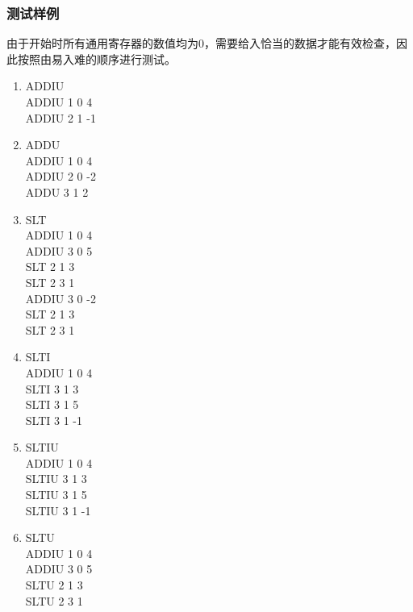         \subsubsection{测试样例}
            由于开始时所有通用寄存器的数值均为0，需要给入恰当的数据才能有效检查，因此按照由易入难的顺序进行测试。
            \begin{enumerate}
            \item
                ADDIU \\
                ADDIU 1 0 4 \\
                ADDIU 2 1 -1
            \item
                ADDU \\
                ADDIU 1 0 4 \\
                ADDIU 2 0 -2 \\
                ADDU 3 1 2
            \item
                SLT \\
                ADDIU 1 0 4 \\
                ADDIU 3 0 5 \\
                SLT 2 1 3 \\
                SLT 2 3 1 \\
                ADDIU 3 0 -2 \\
                SLT 2 1 3 \\
                SLT 2 3 1 \\
            \item
                SLTI \\
                ADDIU 1 0 4 \\
                SLTI 3 1 3 \\
                SLTI 3 1 5 \\
                SLTI 3 1 -1
            \item
                SLTIU \\
                ADDIU 1 0 4 \\
                SLTIU 3 1 3 \\
                SLTIU 3 1 5 \\
                SLTIU 3 1 -1
            \item
                SLTU \\
                ADDIU 1 0 4 \\
                ADDIU 3 0 5 \\
                SLTU 2 1 3 \\
                SLTU 2 3 1 \\

\end{enumerate}
